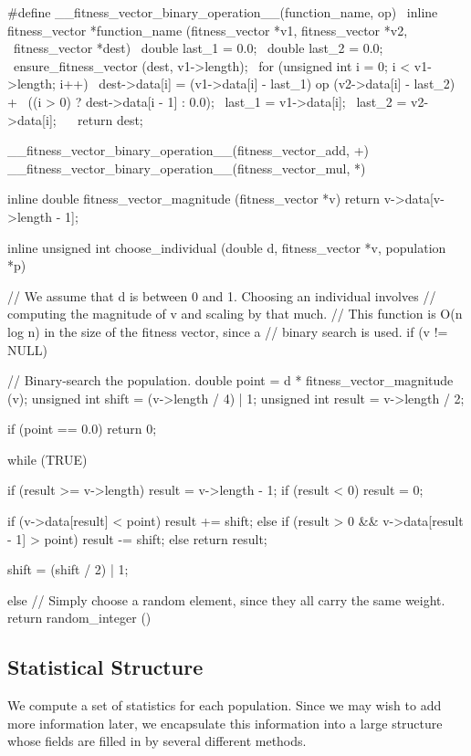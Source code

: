 \documentclass{article}
\begin{document}
\begin{ccode}
#define __fitness_vector_binary_operation__(function_name, op) \
inline fitness_vector *function_name (fitness_vector *v1, fitness_vector *v2, \
				      fitness_vector *dest) { \
  double last_1 = 0.0; \
  double last_2 = 0.0; \
  ensure_fitness_vector (dest, v1->length); \
  for (unsigned int i = 0; i < v1->length; i++) { \
   dest->data[i] = (v1->data[i] - last_1) op (v2->data[i] - last_2) + \
     ((i > 0) ? dest->data[i - 1] : 0.0); \
   last_1 = v1->data[i]; \
   last_2 = v2->data[i]; \
  } \
  return dest; \
}

__fitness_vector_binary_operation__(fitness_vector_add, +)
__fitness_vector_binary_operation__(fitness_vector_mul, *)

inline double fitness_vector_magnitude (fitness_vector *v)
  {return v->data[v->length - 1];}

inline unsigned int choose_individual (double d, fitness_vector *v, population *p) {
  // We assume that d is between 0 and 1. Choosing an individual involves
  // computing the magnitude of v and scaling by that much.
  // This function is O(n log n) in the size of the fitness vector, since a
  // binary search is used.
  if (v != NULL) {
    // Binary-search the population.
    double		point 	= d * fitness_vector_magnitude (v);
    unsigned int	shift 	= (v->length / 4) | 1;
    unsigned int	result 	= v->length / 2;

    if (point == 0.0)
      return 0;

    while (TRUE) {
      if (result >= v->length)	result = v->length - 1;
      if (result < 0)		result = 0;

      if (v->data[result] < point)
	result += shift;
      else if (result > 0 && v->data[result - 1] > point)
	result -= shift;
      else
	return result;

      shift = (shift / 2) | 1;
    }
  } else
    // Simply choose a random element, since they all carry the same weight.
    return random_integer () %
}
\end{ccode}

    \subsection{Statistical Structure}
      \label{sec:statistical-structure}

      We compute a set of statistics for each population. Since we may wish to
      add more information later, we encapsulate this information into a large
      structure whose fields are filled in by several different methods.
\end{document}
